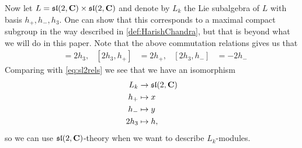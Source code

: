Now let $L=\mathfrak{sl}(2,\mathbf{C})\times \mathfrak{sl}(2,\mathbf{C})$ and denote by $L_k$ the Lie subalgebra of $L$ with basis $h_+,h_-,h_3$. One can show that this corresponds to a maximal compact subgroup in the way described in \cref{def:HarishChandra}, but that is beyond what we will do in this paper. Note that the above commutation relations gives us that 
\begin{align*}
  [h_+,h_-] &= 2h_3, & [2h_3,h_+] &= 2h_+, & [2h_3,h_-] &= -2h_-
\end{align*}
Comparing with \cref{eq:sl2rels} we see that we have an isomorphism
\begin{align}
  \begin{split}
    L_k &\to \mathfrak{sl}(2,\mathbf{C}) \\ \label{eq:sl2iso}
    h_+ &\mapsto x  \\
    h_- &\mapsto y \\
    2h_3 &\mapsto h,
  \end{split}
\end{align}
so we can use $\mathfrak{sl}(2,\mathbf{C})$-theory when we want to describe $L_k$-modules.

